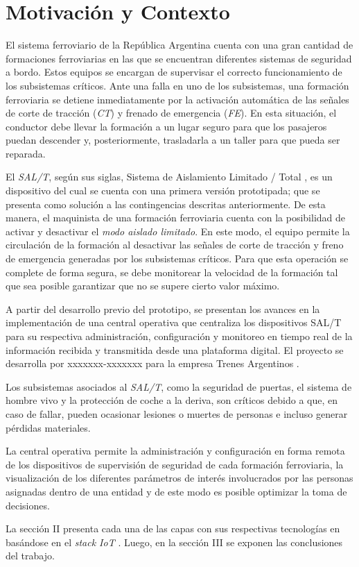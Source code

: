 
\section{Motivación y Contexto}

El sistema ferroviario de la República Argentina cuenta con una gran cantidad de formaciones ferroviarias en las que se encuentran diferentes sistemas de seguridad a bordo. Estos equipos se encargan de supervisar el correcto funcionamiento de los subsistemas críticos. Ante una falla en uno de los subsistemas, una formación ferroviaria se detiene inmediatamente por la activación automática de las señales de corte de tracción (\textit{CT}) y frenado de emergencia (\textit{FE}). En esta situación, el conductor debe llevar la formación a un lugar seguro para que los pasajeros puedan descender y, posteriormente, trasladarla a un taller para que pueda ser reparada.

El \textit{SAL/T}, según sus siglas, Sistema de Aislamiento Limitado / Total \cite{b1}, es un dispositivo del cual se cuenta con una primera versión prototipada; que se presenta como solución a las contingencias descritas anteriormente. De esta manera, el maquinista de una formación ferroviaria cuenta con la posibilidad de activar y desactivar el \textit{modo aislado limitado}. En este modo, el equipo permite la circulación de la formación al desactivar las señales de corte de tracción y freno de emergencia generadas por los subsistemas críticos. Para que esta operación se complete de forma segura, se debe monitorear la velocidad de la formación tal que sea posible garantizar que no se supere cierto valor máximo.

A partir del desarrollo previo del prototipo, se presentan los avances en la implementación de una central operativa que centraliza los dispositivos SAL/T para su respectiva administración, configuración y monitoreo en tiempo real de la información recibida y transmitida desde una plataforma digital. El proyecto se desarrolla por xxxxxxx-xxxxxxx \cite{b2} para la empresa Trenes Argentinos \cite{b3}.

Los subsistemas asociados al \textit{SAL/T}, como la seguridad de puertas, el sistema de hombre vivo y la protección de coche a la deriva, son críticos debido a que, en caso de fallar, pueden ocasionar lesiones o muertes de personas e incluso generar pérdidas materiales. 

La central operativa permite la administración y configuración en forma remota de los dispositivos de supervisión de seguridad de cada formación ferroviaria, la visualización de los diferentes parámetros de interés involucrados por las personas asignadas dentro de una entidad y de este modo es posible optimizar la toma de decisiones. 

La sección II presenta cada una de las capas con sus respectivas tecnologías en basándose en el \textit{stack IoT} \cite{b4}. Luego, en la sección III se exponen las conclusiones del trabajo.


